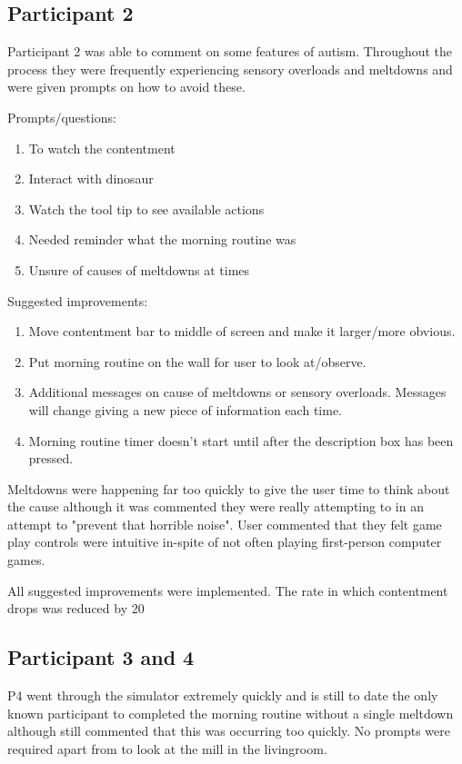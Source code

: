 \subsection*{Participant 2} 
Participant 2 was able to comment on some features of autism. Throughout the process they were frequently experiencing sensory overloads and meltdowns and were given prompts on how to avoid these.

Prompts/questions:
\begin{enumerate}
\item To watch the contentment
\item Interact with dinosaur
\item Watch the tool tip to see available actions
\item Needed reminder what the morning routine was
\item Unsure of causes of meltdowns at times
\end{enumerate}

Suggested improvements:
\begin{enumerate}
\item Move contentment bar to middle of screen and make it larger/more obvious. 
\item Put morning routine on the wall for user to look at/observe. 
\item Additional messages on cause of meltdowns or sensory overloads. Messages will change giving a new piece of information each time.
\item Morning routine timer doesn't start until after the description box has been pressed. 
\end{enumerate}

Meltdowns were happening far too quickly to give the user time to think about the cause although it was commented they were really attempting to in an attempt to "prevent that horrible noise". User commented that they felt game play controls were intuitive in-spite of not often playing first-person computer games. 

All suggested improvements were implemented. The rate in which contentment drops was reduced by 20%

\subsection*{Participant 3 and 4}
P4 went through the simulator extremely quickly and is still to date the only known participant to completed the morning routine without a single meltdown although still commented that this was occurring too quickly. No prompts were required apart from to look at the mill in the livingroom. 

